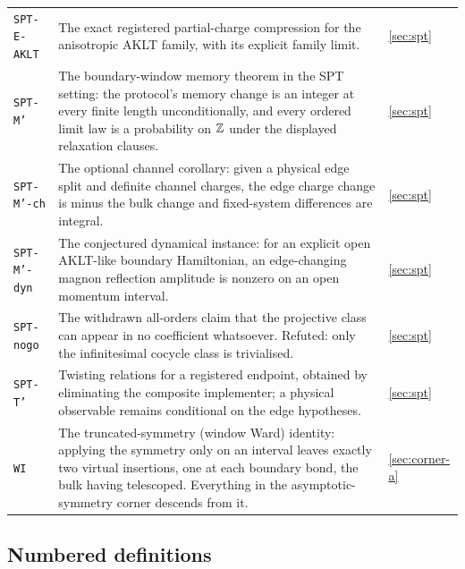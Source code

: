 {\begin{longtable}{@{}p{}p{}p{}@{}}
\texttt{SPT-E-AKLT} & The exact registered partial-charge compression for the
anisotropic AKLT family, with its explicit family limit. & \cref{sec:spt}\\

\texttt{SPT-M'} & The boundary-window memory theorem in the SPT setting:
the protocol's memory change is an integer at every finite length
unconditionally, and every ordered limit law is a probability on $\mathbb{Z}$ under
the displayed relaxation clauses. & \cref{sec:spt}\\

\texttt{SPT-M'-ch} & The optional channel corollary: given a physical edge
split and definite channel charges, the edge charge change is minus the bulk
change and fixed-system differences are integral. & \cref{sec:spt}\\

\texttt{SPT-M'-dyn} & The conjectured dynamical instance: for an explicit open
AKLT-like boundary Hamiltonian, an edge-changing magnon reflection amplitude
is nonzero on an open momentum interval. & \cref{sec:spt}\\

\texttt{SPT-nogo} & The withdrawn all-orders claim that the projective class
can appear in no coefficient whatsoever. Refuted: only the infinitesimal
cocycle class is trivialised. & \cref{sec:spt}\\

\texttt{SPT-T'} & Twisting relations for a registered endpoint, obtained by
eliminating the composite implementer; a physical observable remains
conditional on the edge hypotheses. & \cref{sec:spt}\\

\texttt{WI} & The truncated-symmetry (window Ward) identity: applying the
symmetry only on an interval leaves exactly two virtual insertions, one at
each boundary bond, the bulk having telescoped. Everything in the
asymptotic-symmetry corner descends from it. & \cref{sec:corner-a}\\
\end{longtable}
}

\subsection{Numbered definitions}

